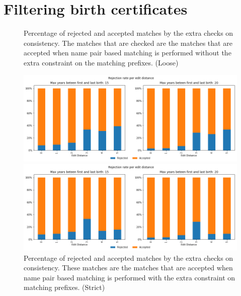 \section{Filtering birth certificates}

\begin{figure}
	\begin{center}
		\caption[Consistency check acceptance rate (no prefix constraint)]{\label{fig:consistency_check_loose}Percentage of rejected and accepted matches by the extra checks on consistency. The matches that are checked are the matches that are accepted when name pair based matching is performed without the extra constraint on the matching prefixes. (Loose) }
		\includegraphics[scale=0.45]{figures/rejection_rate_loose.png}
		\caption[Consistency check acceptance rate (with prefix constraint)]{\label{fig:consistency_check_strict} Percentage of rejected and accepted matches by the extra checks on consistency. These matches are the matches that are accepted when name pair based matching is performed with the extra constraint on matching prefixes. (Strict)}
		\includegraphics[scale=0.45]{figures/rejection_rate_strict.png}
		\vspace{0.5cm}
	\end{center}
\end{figure}

